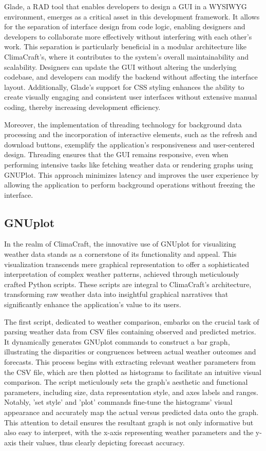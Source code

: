 \documentclass[sn-mathphys-num]{sn-jnl}%
\begin{document}
Glade, a RAD tool that enables developers to design a GUI in a WYSIWYG environment, emerges as a critical asset in this development framework. It allows for the separation of interface design from code logic, enabling designers and developers to collaborate more effectively without interfering with each other's work. This separation is particularly beneficial in a modular architecture like ClimaCraft's, where it contributes to the system's overall maintainability and scalability. Designers can update the GUI without altering the underlying codebase, and developers can modify the backend without affecting the interface layout. Additionally, Glade's support for CSS styling enhances the ability to create visually engaging and consistent user interfaces without extensive manual coding, thereby increasing development efficiency.

Moreover, the implementation of threading technology for background data processing and the incorporation of interactive elements, such as the refresh and download buttons, exemplify the application's responsiveness and user-centered design. Threading ensures that the GUI remains responsive, even when performing intensive tasks like fetching weather data or rendering graphs using GNUPlot. This approach minimizes latency and improves the user experience by allowing the application to perform background operations without freezing the interface.

\subsection{GNUplot}\label{sec3.3}

In the realm of ClimaCraft, the innovative use of GNUplot for visualizing weather data stands as a cornerstone of its functionality and appeal. This visualization transcends mere graphical representation to offer a sophisticated interpretation of complex weather patterns, achieved through meticulously crafted Python scripts. These scripts are integral to ClimaCraft's architecture, transforming raw weather data into insightful graphical narratives that significantly enhance the application's value to its users.

The first script, dedicated to weather comparison, embarks on the crucial task of parsing weather data from CSV files containing observed and predicted metrics. It dynamically generates GNUplot commands to construct a bar graph, illustrating the disparities or congruences between actual weather outcomes and forecasts. This process begins with extracting relevant weather parameters from the CSV file, which are then plotted as histograms to facilitate an intuitive visual comparison. The script meticulously sets the graph's aesthetic and functional parameters, including size, data representation style, and axes labels and ranges. Notably, 'set style' and 'plot' commands fine-tune the histograms' visual appearance and accurately map the actual versus predicted data onto the graph. This attention to detail ensures the resultant graph is not only informative but also easy to interpret, with the x-axis representing weather parameters and the y-axis their values, thus clearly depicting forecast accuracy.
\end{document}
